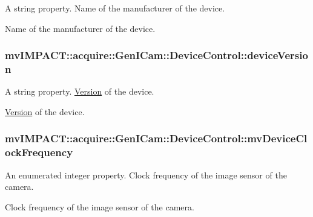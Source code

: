 A string property. Name of the manufacturer of the device. 

Name of the manufacturer of the device. \hypertarget{classmv_i_m_p_a_c_t_1_1acquire_1_1_gen_i_cam_1_1_device_control_a4149e3f594161773c8b1f825caa7ece8}{
\subsubsection[{device\+Version}]{ mv\+I\+M\+P\+A\+C\+T\+::acquire\+::\+Gen\+I\+Cam\+::\+Device\+Control\+::device\+Version}}\label{classmv_i_m_p_a_c_t_1_1acquire_1_1_gen_i_cam_1_1_device_control_a4149e3f594161773c8b1f825caa7ece8}


A string property. \hyperlink{struct_version}{Version} of the device. 

\hyperlink{struct_version}{Version} of the device. \hypertarget{classmv_i_m_p_a_c_t_1_1acquire_1_1_gen_i_cam_1_1_device_control_ad1a0fb21b8f3474949b2e854e23d5674}{
\subsubsection[{mv\+Device\+Clock\+Frequency}]{ mv\+I\+M\+P\+A\+C\+T\+::acquire\+::\+Gen\+I\+Cam\+::\+Device\+Control\+::mv\+Device\+Clock\+Frequency}}\label{classmv_i_m_p_a_c_t_1_1acquire_1_1_gen_i_cam_1_1_device_control_ad1a0fb21b8f3474949b2e854e23d5674}


An enumerated integer property. Clock frequency of the image sensor of the camera. 

Clock frequency of the image sensor of the camera.

